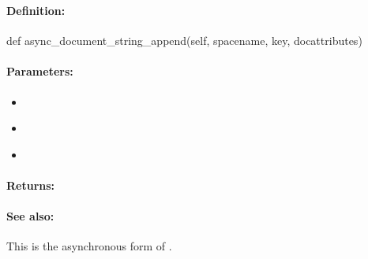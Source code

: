 \pagebreak
\subsubsection{}
\label{api:python:async_document_string_append}


\paragraph{Definition:}
\begin{pythoncode}
def async_document_string_append(self, spacename, key, docattributes)
\end{pythoncode}

\paragraph{Parameters:}
\begin{itemize}[noitemsep]
\item {}\\

\item {}\\

\item {}\\

\end{itemize}

\paragraph{Returns:}


\paragraph{See also:}  This is the asynchronous form of .

\pagebreak
\subsubsection{}
\label{api:python:map_atomic_add}


